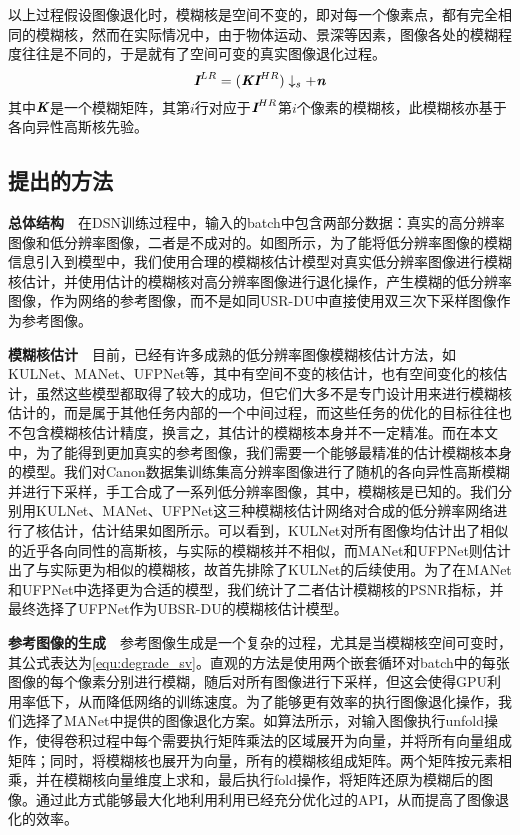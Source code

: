 以上过程假设图像退化时，模糊核是空间不变的，即对每一个像素点，都有完全相同的模糊核，然而在实际情况中，由于物体运动、景深等因素，图像各处的模糊程度往往是不同的，于是就有了空间可变的真实图像退化过程。
\begin{equation}
    \textbf{\em I}^{LR}=(\textbf{\em K}\textbf{\em I}^{HR})\downarrow_s+\textbf{\em n}\label{equ:degrade_sv}
\end{equation}
其中$\textbf{\em K}$是一个模糊矩阵，其第$i$行对应于$\textbf{\em I}^{HR}$第$i$个像素的模糊核，此模糊核亦基于各向异性高斯核先验。
\subsection{提出的方法}
\noindent\textbf{总体结构}\ \ 在DSN训练过程中，输入的batch中包含两部分数据：真实的高分辨率图像和低分辨率图像，二者是不成对的。如图所示，为了能将低分辨率图像的模糊信息引入到模型中，我们使用合理的模糊核估计模型对真实低分辨率图像进行模糊核估计，并使用估计的模糊核对高分辨率图像进行退化操作，产生模糊的低分辨率图像，作为网络的参考图像，而不是如同USR-DU中直接使用双三次下采样图像作为参考图像。

\noindent\textbf{模糊核估计}\ \ 目前，已经有许多成熟的低分辨率图像模糊核估计方法，如KULNet、MANet、UFPNet等，其中有空间不变的核估计，也有空间变化的核估计，虽然这些模型都取得了较大的成功，但它们大多不是专门设计用来进行模糊核估计的，而是属于其他任务内部的一个中间过程，而这些任务的优化的目标往往也不包含模糊核估计精度，换言之，其估计的模糊核本身并不一定精准。而在本文中，为了能得到更加真实的参考图像，我们需要一个能够最精准的估计模糊核本身的模型。我们对Canon数据集训练集高分辨率图像进行了随机的各向异性高斯模糊并进行下采样，手工合成了一系列低分辨率图像，其中，模糊核是已知的。我们分别用KULNet、MANet、UFPNet这三种模糊核估计网络对合成的低分辨率网络进行了核估计，估计结果如图所示。可以看到，KULNet对所有图像均估计出了相似的近乎各向同性的高斯核，与实际的模糊核并不相似，而MANet和UFPNet则估计出了与实际更为相似的模糊核，故首先排除了KULNet的后续使用。为了在MANet和UFPNet中选择更为合适的模型，我们统计了二者估计模糊核的PSNR指标，并最终选择了UFPNet作为UBSR-DU的模糊核估计模型。

\noindent\textbf{参考图像的生成}\ \ 参考图像生成是一个复杂的过程，尤其是当模糊核空间可变时，其公式表达为\ref{equ:degrade_sv}。直观的方法是使用两个嵌套循环对batch中的每张图像的每个像素分别进行模糊，随后对所有图像进行下采样，但这会使得GPU利用率低下，从而降低网络的训练速度。为了能够更有效率的执行图像退化操作，我们选择了MANet中提供的图像退化方案。如算法所示，对输入图像执行unfold操作，使得卷积过程中每个需要执行矩阵乘法的区域展开为向量，并将所有向量组成矩阵；同时，将模糊核也展开为向量，所有的模糊核组成矩阵。两个矩阵按元素相乘，并在模糊核向量维度上求和，最后执行fold操作，将矩阵还原为模糊后的图像。通过此方式能够最大化地利用利用已经充分优化过的API，从而提高了图像退化的效率。

